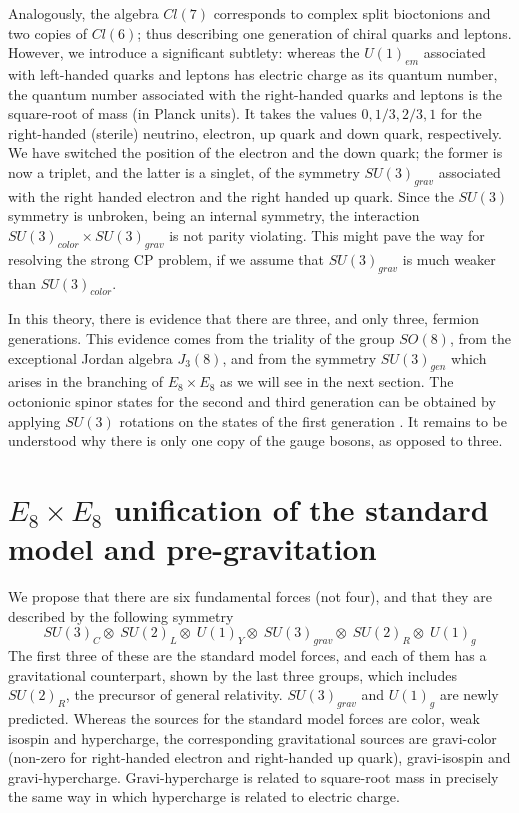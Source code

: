 \documentclass[a4paper]{jpconf}
\begin{document}
Analogously, the algebra $Cl(7)$ corresponds to complex split bioctonions and two copies of $Cl(6)$; thus describing one generation of chiral quarks and leptons. However, we introduce a significant subtlety: whereas the $U(1)_{em}$ associated with left-handed quarks and leptons has electric charge as its quantum number, the quantum number associated with the right-handed quarks and leptons is the square-root of mass (in Planck units). It takes the values $0, 1/3, 2/3, 1$ for the right-handed (sterile) neutrino, electron, up quark and down quark, respectively. We have switched the position of the electron and the down quark; the former is now a triplet, and the latter is a singlet, of the symmetry $SU(3)_{grav}$ associated with the right handed electron and the right handed up quark. Since the $SU(3)$ symmetry is unbroken, being an internal symmetry, the interaction $SU(3)_{color} \times SU(3)_{grav}$ is not parity violating. This might pave the way for resolving the strong CP problem, if we assume that  $SU(3)_{grav}$ is much weaker than $SU(3)_{color}$.

In this theory, there is evidence that there are three, and only three, fermion generations. This evidence comes from the triality of the group $SO(8)$, from the exceptional Jordan algebra $J_3(8)$, and from the symmetry $SU(3)_{gen}$ which arises in the branching of $E_8 \times E_8$ as we will see in the next section. The octonionic spinor states for the second and third generation can be obtained by applying $SU(3)$ rotations on the states of the first generation \cite{Singhfsc, Vivan}. It remains to be understood why there is only one copy of the gauge bosons, as opposed to  three.

\section{ $E_8 \times E_8$ unification of the standard model and pre-gravitation}
We propose that there are six fundamental forces (not four), and that they are described by the following symmetry
\begin{equation}
SU(3)_C \otimes \; SU(2)_{L} \otimes \; U(1)_Y \otimes \; SU(3)_{grav} \otimes\; SU(2)_{R} \otimes\; U(1)_{g}
\end{equation}
The first three of these are the standard model forces, and each of them has a gravitational counterpart, shown by the last three groups, which includes $SU(2)_R$, the precursor of general relativity. $SU(3)_{grav}$ and $U(1)_g$ are newly predicted. Whereas the sources for the standard model forces are color, weak isospin and hypercharge, the corresponding gravitational sources are gravi-color 
(non-zero for right-handed electron and right-handed up quark), gravi-isospin and gravi-hypercharge. Gravi-hypercharge is related to square-root mass in precisely the same way in which hypercharge is related to electric charge.
\end{document}
